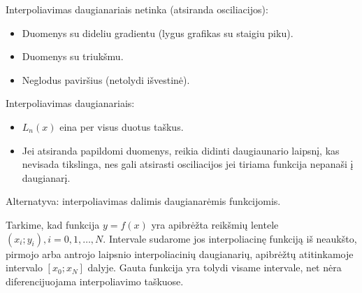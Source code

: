 







Interpoliavimas daugianariais netinka (atsiranda osciliacijos):
\begin{itemize}
  \item Duomenys su dideliu gradientu (lygus grafikas su staigiu piku).
  \item Duomenys su triukšmu.
  \item Neglodus paviršius (netolydi išvestinė).
\end{itemize}



Interpoliavimas daugianariais:
\begin{itemize}
  \item $L_{n}(x)$ eina per visus duotus taškus.
  \item Jei atsiranda papildomi duomenys, reikia didinti daugiaunario laipsnį,
    kas nevisada tikslinga, nes gali atsirasti osciliacijos jei tiriama
    funkcija nepanaši į daugianarį.
\end{itemize}

Alternatyva: interpoliavimas dalimis daugianarėmis funkcijomis.



Tarkime, kad funkcija $y=f(x)$ yra apibrėžta reikšmių lentele
$(x_{i};y_{i}), i=0,1,\ldots,N$. Intervale sudarome jos interpoliacinę
funkciją iš neaukšto, pirmojo arba antrojo laipsnio interpoliacinių
daugianarių, apibrėžtų atitinkamoje intervalo $\left[ x_{0}; x_{N} \right]$
dalyje. Gauta funkcija yra tolydi visame intervale, net nėra
diferencijuojama interpoliavimo taškuose.


